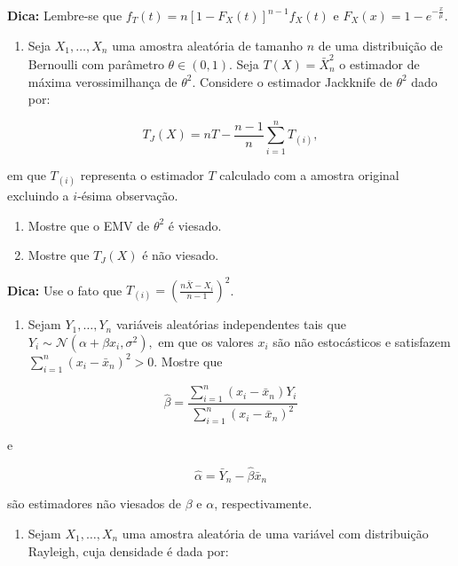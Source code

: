 \documentclass[
  letterpaper,
  DIV=11,
  numbers=noendperiod]{scrreprt}
\providecommand{\tightlist}{%
  \setlength{\itemsep}{0pt}\setlength{\parskip}{0pt}}\usepackage{longtable,booktabs,array}
\begin{document}
\textbf{Dica:} Lembre-se que \(f_T(t) = n[1 - F_X(t)]^{n-1}f_X(t)\) e
\(F_X(x) = 1 - e^{-\frac{x}{\mu}}\).

\begin{enumerate}
\def\labelenumi{\arabic{enumi}.}
\setcounter{enumi}{1}
\tightlist
\item
  Seja \(X_1, \ldots, X_n\) uma amostra aleatória de tamanho \(n\) de
  uma distribuição de Bernoulli com parâmetro \(\theta \in (0,1)\). Seja
  \(T(X) = \bar{X}_n^2\) o estimador de máxima verossimilhança de
  \(\theta^2\). Considere o estimador Jackknife de \(\theta^2\) dado
  por:
\end{enumerate}

\[T_J(X) = nT - \frac{n-1}{n} \sum_{i=1}^{n} T_{(i)},\]

em que \(T_{(i)}\) representa o estimador \(T\) calculado com a amostra
original excluindo a \(i\)-ésima observação.

\begin{enumerate}
\def\labelenumi{\alph{enumi}.}
\item
  Mostre que o EMV de \(\theta^2\) é viesado.
\item
  Mostre que \(T_J(X)\) é não viesado.
\end{enumerate}

\textbf{Dica:} Use o fato que
\(T_{(i)} = \left(\frac{n\bar{X} - X_i}{n-1}\right)^2\).

\begin{enumerate}
\def\labelenumi{\arabic{enumi}.}
\setcounter{enumi}{2}
\tightlist
\item
  Sejam \(Y_1, \ldots, Y_n\) variáveis aleatórias independentes tais que
  \(Y_i \sim \mathcal{N}(\alpha + \beta x_i, \sigma^2),\) em que os
  valores \(x_i\) são não estocásticos e satisfazem
  \(\sum_{i=1}^{n} (x_i - \bar{x}_n)^2 > 0.\) Mostre que
\end{enumerate}

\[\hat{\beta} = \frac{\sum_{i=1}^{n} (x_i - \bar{x}_n) Y_i}{\sum_{i=1}^{n} (x_i - \bar{x}_n)^2}\]

e

\[\hat{\alpha} = \bar{Y}_n - \hat{\beta} \bar{x}_n\]

são estimadores não viesados de \(\beta\) e \(\alpha\), respectivamente.

\begin{enumerate}
\def\labelenumi{\arabic{enumi}.}
\setcounter{enumi}{3}
\tightlist
\item
  Sejam \(X_1, \ldots, X_n\) uma amostra aleatória de uma variável com
  distribuição Rayleigh, cuja densidade é dada por:
\end{enumerate}
\end{document}
